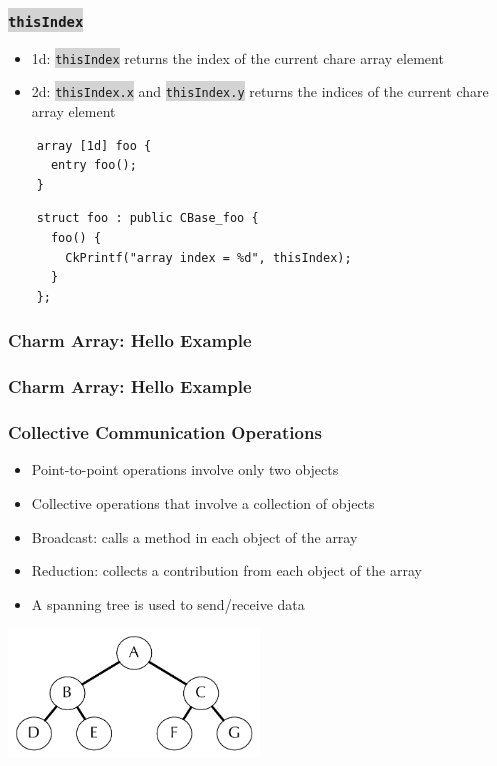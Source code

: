 \documentclass{beamer}
\newcommand{\code}[1]{\colorbox{lightgray}{\texttt{#1}}}
\begin{document}
\begin{frame}[fragile]
  \frametitle{\code{thisIndex}}
  \begin{itemize}
  \item 1d: \code{thisIndex} returns the index of the current chare array element
  \item 2d: \code{thisIndex.x} and \code{thisIndex.y} returns the indices of
    the current chare array element
  \end{itemize}
  \begin{lstlisting}
    array [1d] foo {
      entry foo();
    }
  \end{lstlisting}

  \begin{lstlisting}
    struct foo : public CBase_foo {
      foo() {
        CkPrintf("array index = %d", thisIndex);
      }
    };
  \end{lstlisting}

\end{frame}

\begin{frame}[fragile]
  \frametitle{Charm Array: Hello Example }
  
\end{frame}

\begin{frame}[fragile]
  \frametitle{Charm Array: Hello Example }
  
\end{frame}

\begin{frame}[fragile]
  \frametitle{Collective Communication Operations}
  \begin{itemize}
    \item Point-to-point operations involve only two objects
    \item Collective operations that involve a collection of objects
    \item Broadcast: calls a method in each object of the array
    \item Reduction: collects a contribution from each object of the array
    \item A spanning tree is used to send/receive data
  \end{itemize}
    \begin{center} \includegraphics[width=0.5\textwidth]{diagrams/spanningTree.pdf} \end{center}
\end{frame}
\end{document}

